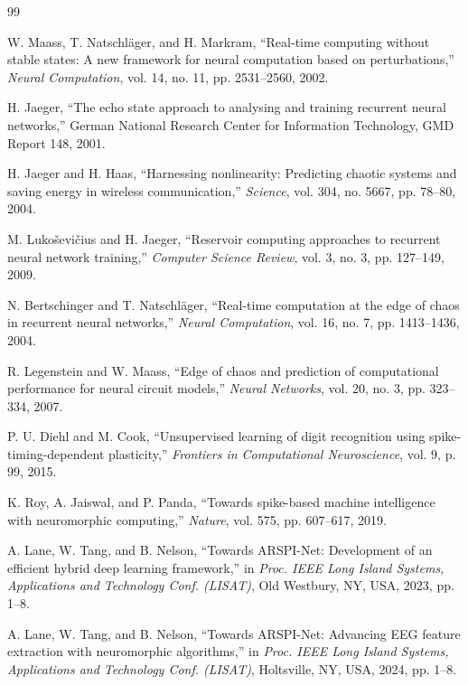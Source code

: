 \documentclass[conference]{IEEEtran}
\begin{document}
\begin{thebibliography}{99}

W. Maass, T. Natschl\"ager, and H. Markram, ``Real-time computing without stable states: A new framework for neural computation based on perturbations,'' \emph{Neural Computation}, vol. 14, no. 11, pp. 2531--2560, 2002.

H. Jaeger, ``The echo state approach to analysing and training recurrent neural networks,'' German National Research Center for Information Technology, GMD Report 148, 2001.

H. Jaeger and H. Haas, ``Harnessing nonlinearity: Predicting chaotic systems and saving energy in wireless communication,'' \emph{Science}, vol. 304, no. 5667, pp. 78--80, 2004.

M. Luko\v{s}evi\v{c}ius and H. Jaeger, ``Reservoir computing approaches to recurrent neural network training,'' \emph{Computer Science Review}, vol. 3, no. 3, pp. 127--149, 2009.

N. Bertschinger and T. Natschl\"ager, ``Real-time computation at the edge of chaos in recurrent neural networks,'' \emph{Neural Computation}, vol. 16, no. 7, pp. 1413--1436, 2004.

R. Legenstein and W. Maass, ``Edge of chaos and prediction of computational performance for neural circuit models,'' \emph{Neural Networks}, vol. 20, no. 3, pp. 323--334, 2007.

P. U. Diehl and M. Cook, ``Unsupervised learning of digit recognition using spike-timing-dependent plasticity,'' \emph{Frontiers in Computational Neuroscience}, vol. 9, p. 99, 2015.

K. Roy, A. Jaiswal, and P. Panda, ``Towards spike-based machine intelligence with neuromorphic computing,'' \emph{Nature}, vol. 575, pp. 607--617, 2019.

A. Lane, W. Tang, and B. Nelson, ``Towards ARSPI-Net: Development of an efficient hybrid deep learning framework,'' in \emph{Proc. IEEE Long Island Systems, Applications and Technology Conf. (LISAT)}, Old Westbury, NY, USA, 2023, pp. 1--8.

A. Lane, W. Tang, and B. Nelson, ``Towards ARSPI-Net: Advancing EEG feature extraction with neuromorphic algorithms,'' in \emph{Proc. IEEE Long Island Systems, Applications and Technology Conf. (LISAT)}, Holtsville, NY, USA, 2024, pp. 1--8.


\end{thebibliography}
\end{document}
